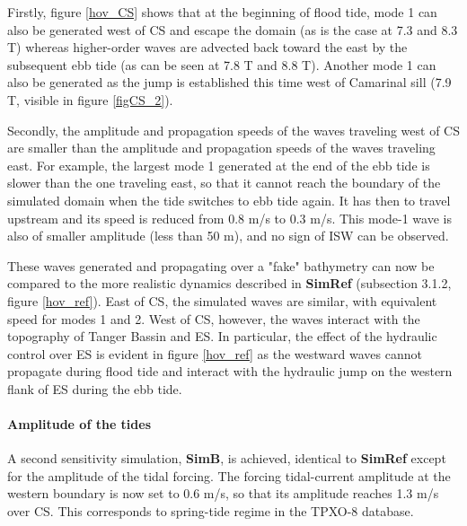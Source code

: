 Firstly, figure \ref{hov_CS} shows that at the beginning of flood tide, mode 1 can also be generated west of CS and escape the domain (as is the case at 7.3 and 8.3 T) whereas higher-order waves are advected back toward the east by the subsequent ebb tide (as can be seen at 7.8 T and 8.8 T). Another mode 1 can also be generated as the jump is established this time west of Camarinal sill (7.9 T, visible in figure \ref{figCS_2}).

Secondly, the amplitude and propagation speeds of the waves traveling west of CS are smaller than the amplitude and propagation speeds of the waves traveling east. For example, the largest mode 1 generated at the end of the ebb tide is slower than the one traveling east, so that it cannot reach the boundary of the simulated domain when the tide switches to ebb tide again. It has then to travel upstream and its speed is reduced from 0.8 m/s to 0.3 m/s. This mode-1 wave is also of smaller amplitude (less than 50 m), and no sign of ISW can be observed.

These waves generated and propagating over a "fake" bathymetry can now be compared to the more realistic dynamics described in \textbf{SimRef} (subsection 3.1.2, figure \ref{hov_ref}). East of CS, the simulated waves are similar, with equivalent speed for modes 1 and 2. West of CS, however, the waves interact with the topography of Tanger Bassin and ES. In particular, the effect of the hydraulic control over ES is evident in figure \ref{hov_ref} as the westward waves cannot propagate during flood tide and interact with the hydraulic jump on the western flank of ES during the ebb tide. 


\paragraph{Amplitude of the tides}

A second sensitivity simulation, \textbf{SimB}, is achieved, identical to \textbf{SimRef} except for the amplitude of the tidal forcing. The forcing tidal-current amplitude at the western boundary is now set to 0.6 m/s, so that its amplitude reaches 1.3 m/s over CS. This corresponds to spring-tide regime in the TPXO-8 database.

